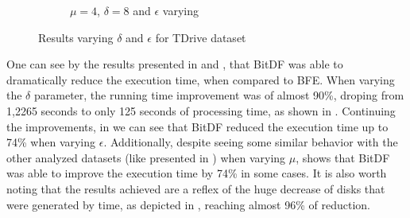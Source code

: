 {\begin{figure}[h!]
\begin{subfigure}[t]{0.48\textwidth}
        \caption{$\mu = 4$, $\delta = 8$ and $\epsilon$ varying}
        \label{fig:tdrive_vary_g}
    \end{subfigure}
    \caption{Results varying $\delta$ and $\epsilon$ for TDrive dataset}
    \label{fig:tdrive_results}
\end{figure}

One can see by the results presented in  and , that BitDF was
able to dramatically reduce the execution time, when compared to BFE. When varying the $\delta$ parameter, the running
time improvement was of almost 90\%, droping from 1,2265 seconds to only 125 seconds of processing time, as shown in
. Continuing the improvements, in  we can see that BitDF reduced the
execution time up to 74\% when varying $\epsilon$. Additionally, despite seeing some similar behavior with the other
analyzed datasets (like presented in ) when varying $\mu$,  shows that
BitDF was able to improve the execution time by 74\% in some cases. It is also worth noting that the results achieved
are a reflex of the huge decrease of disks that were generated by time, as depicted in ,
reaching almost 96\% of reduction.

}
